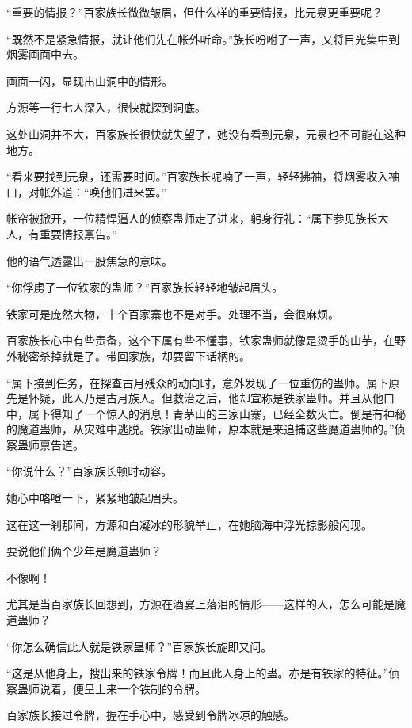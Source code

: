 
\begin{this_body}

“重要的情报？”百家族长微微皱眉，但什么样的重要情报，比元泉更重要呢？

“既然不是紧急情报，就让他们先在帐外听命。”族长吩咐了一声，又将目光集中到烟雾画面中去。

画面一闪，显现出山洞中的情形。

方源等一行七人深入，很快就探到洞底。

这处山洞并不大，百家族长很快就失望了，她没有看到元泉，元泉也不可能在这种地方。

“看来要找到元泉，还需要时间。”百家族长呢喃了一声，轻轻拂袖，将烟雾收入袖口，对帐外道：“唤他们进来罢。”

帐帘被掀开，一位精悍逼人的侦察蛊师走了进来，躬身行礼：“属下参见族长大人，有重要情报禀告。”

他的语气透露出一股焦急的意味。

“你俘虏了一位铁家的蛊师？”百家族长轻轻地皱起眉头。

铁家可是庞然大物，十个百家寨也不是对手。处理不当，会很麻烦。

百家族长心中有些责备，这个下属有些不懂事，铁家蛊师就像是烫手的山芋，在野外秘密杀掉就是了。带回家族，却要留下话柄的。

“属下接到任务，在探查古月残众的动向时，意外发现了一位重伤的蛊师。属下原先是怀疑，此人乃是古月族人。但救治之后，他却宣称是铁家蛊师。并且从他口中，属下得知了一个惊人的消息！青茅山的三家山寨，已经全数灭亡。倒是有神秘的魔道蛊师，从灾难中逃脱。铁家出动蛊师，原本就是来追捕这些魔道蛊师的。”侦察蛊师禀告道。

“你说什么？”百家族长顿时动容。

她心中咯噔一下，紧紧地皱起眉头。

这在这一刹那间，方源和白凝冰的形貌举止，在她脑海中浮光掠影般闪现。

要说他们俩个少年是魔道蛊师？

不像啊！

尤其是当百家族长回想到，方源在酒宴上落泪的情形——这样的人，怎么可能是魔道蛊师？

“你怎么确信此人就是铁家蛊师？”百家族长旋即又问。

“这是从他身上，搜出来的铁家令牌！而且此人身上的蛊。亦是有铁家的特征。”侦察蛊师说着，便呈上来一个铁制的令牌。

百家族长接过令牌，握在手心中，感受到令牌冰凉的触感。


\end{this_body}
